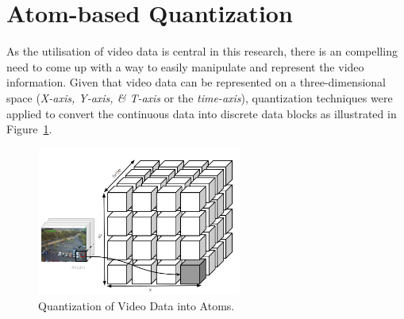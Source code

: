 


\section{Atom-based Quantization}
\label{section:atoms}

As the utilisation of video data is central in this research, there is an compelling need to come up with a way to easily manipulate and represent the video information. Given that video data can be represented on a three-dimensional space (\textit{X-axis, Y-axis, \& T-axis} or the \textit{time-axis}), quantization techniques were applied to convert the continuous data into discrete data blocks as illustrated in Figure~\ref{fig:atoms}.

\begin{figure}[H]\centering
\includegraphics[width=0.6\textwidth]{image/general/atom.PNG}
\caption[Quantization of Video Data into Atoms.]
{Quantization of Video Data into Atoms.}
\label{fig:atoms}
\end{figure}

